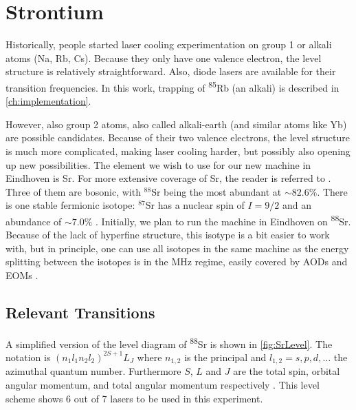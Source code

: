 \section{Strontium}\label{sec:Sr}

Historically, people started laser cooling experimentation on group 1 or alkali atoms (Na, Rb, Cs). Because they only have one valence electron, the level structure is relatively straightforward. Also, diode lasers are available for their transition frequencies. In this work, trapping of \textsuperscript{85}Rb (an alkali) is described in \cref{ch:implementation}.

However, also group 2 atoms, also called alkali-earth (and similar atoms like Yb) are possible candidates. Because of their two valence electrons, the level structure is much more complicated, making laser cooling harder, but possibly also opening up new possibilities. The element we wish to use for our new machine in Eindhoven is Sr. For more extensive coverage of Sr, the reader is referred to \cite{Stellmer2013}. Three of them are bosonic, with ${}^{88}$Sr being the most abundant at $\sim82.6\%$. There is one stable fermionic isotope: ${}^{87}$Sr has a nuclear spin of $I=9/2$ and an abundance of $\sim7.0\%$ \cite{Coursey1999}. Initially, we plan to run the machine in Eindhoven on \textsuperscript{88}Sr. Because of the lack of hyperfine structure, this isotype is a bit easier to work with, but in principle, one can use all isotopes in the same machine as the energy splitting between the isotopes is in the MHz regime, easily covered by AODs and EOMs \cite{Stellmer2013}.

\subsection{Relevant Transitions}

A simplified version of the level diagram of \textsuperscript{88}Sr is shown in \cref{fig:SrLevel}. The notation is $(n_1l_1 n_2l_2)^{2S+1}L_J$ where $n_{1,2}$ is the principal and $l_{1,2} = s, p, d, \ldots$ the azimuthal quantum number. Furthermore $S$, $L$ and $J$ are the total spin, orbital angular momentum, and total angular momentum respectively \cite{Cowan1981}.  This level scheme shows 6 out of 7 lasers to be used in this experiment. 

